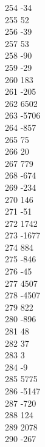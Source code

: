{ 254	-34 \\
 255	52 \\
 256	-39 \\
 257	53 \\
 258	-90 \\
 259	-29 \\
 260	183 \\
 261	-205 \\
 262	6502 \\
 263	-5706 \\
 264	-857 \\
 265	75 \\
 266	20 \\
 267	779 \\
 268	-674 \\
 269	-234 \\
 270	146 \\
 271	-51 \\
 272	1742 \\
 273	-1677 \\
 274	884 \\
 275	-846 \\
 276	-45 \\
 277	4507 \\
 278	-4507 \\
 279	822 \\
 280	-896 \\
 281	48 \\
 282	37 \\
 283	3 \\
 284	-9 \\
 285	5775 \\
 286	-5147 \\
 287	-720 \\
 288	124 \\
 289	2078 \\
 290	-267 \\
}
